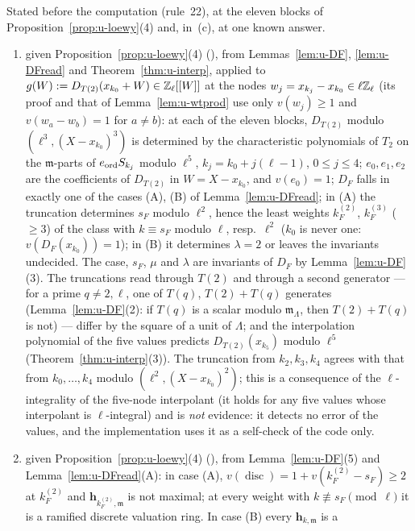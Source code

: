 \documentclass[11pt]{article}
\newcommand{\Iw}{\Lambda}                         %
\newcommand{\hcusp}{\mathbf{h}}                   %
\newcommand{\Zl}{\Z_\ell}
\begin{document}
\begin{prediction}\label{pr:u-H2}
Stated before the computation (rule~22), at the eleven blocks of Proposition~\ref{prop:u-loewy}(4) and, in~(c), at one known answer.
\begin{enumerate}
\item[(a)] \PROVED{} given Proposition~\ref{prop:u-loewy}(4) (\COMP), from Lemmas~\ref{lem:u-DF}, \ref{lem:u-DFread} and Theorem~\ref{thm:u-interp}, applied to
  $g(W):=D_{T(2)}(x_{k_0}+W)\in\Zl[[W]]$ at the nodes $w_j=x_{k_j}-x_{k_0}\in\ell\Zl$ (its proof and that of Lemma~\ref{lem:u-wtprod} use only
  $v(w_j)\ge1$ and $v(w_a-w_b)=1$ for $a\ne b$): at each of the eleven blocks, $D_{T(2)}$ modulo
  $(\ell^{3},(X-x_{k_0})^{3})$ is determined by the characteristic polynomials of $T_2$ on the $\mathfrak m$-parts of $e_{\mathrm{ord}} S_{k_j}$ modulo $\ell^{5}$, $k_j=k_0+j(\ell-1)$, $0\le j\le4$;
  $e_0,e_1,e_2$ are the coefficients of $D_{T(2)}$ in $W=X-x_{k_0}$, and $v(e_0)=1$; $D_F$ falls in exactly one of the cases (A), (B) of Lemma~\ref{lem:u-DFread}; in (A) the truncation determines $s_F$ modulo $\ell^{2}$, hence the least
  weights $k^{(2)}_F$, $k^{(3)}_F$ ($\ge3$) of the class with $k\equiv s_F$ modulo $\ell$, resp.\ $\ell^{2}$ ($k_0$ is never one: $v(D_F(x_{k_0}))=1$); in (B) it determines $\lambda=2$ or leaves the invariants undecided. The case,
  $s_F$, $\mu$ and $\lambda$ are invariants of $D_F$ by Lemma~\ref{lem:u-DF}(3). The truncations read through $T(2)$ and through a second generator --- for a prime $q\ne2,\ell$, one of $T(q)$, $T(2)+T(q)$ generates (Lemma~\ref{lem:u-DF}(2): if
  $T(q)$ is a scalar modulo $\mathfrak m_\Iw$, then $T(2)+T(q)$ is not) --- differ by the square of a unit of $\Iw$; and the interpolation polynomial of
  the five values predicts $D_{T(2)}(x_{k_5})$ modulo $\ell^{5}$ (Theorem~\ref{thm:u-interp}(3)). The truncation from $k_2,k_3,k_4$ agrees with that from $k_0,\dots,k_4$ modulo
  $(\ell^{2},(X-x_{k_0})^{2})$; this is a consequence of the $\ell$-integrality of the five-node interpolant (it holds for any five values whose interpolant is $\ell$-integral) and is
  \emph{not} evidence: it detects no error of the values, and the implementation uses it as a self-check of the code only.
\item[(b)] \PROVED{} given Proposition~\ref{prop:u-loewy}(4) (\COMP), from Lemma~\ref{lem:u-DF}(5) and Lemma~\ref{lem:u-DFread}(A): in case (A), $v(\operatorname{disc})=1+v(k^{(2)}_F-s_F)\ge2$ at
  $k^{(2)}_F$ and $\hcusp_{k^{(2)}_F,\mathfrak m}$ is not maximal; at every weight with $k\not\equiv s_F\pmod\ell$ it is a ramified discrete valuation ring. In case (B) every $\hcusp_{k,\mathfrak m}$ is a

\end{enumerate}
\end{prediction}
\end{document}
